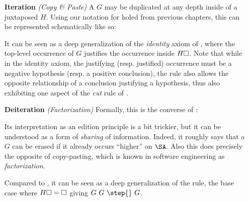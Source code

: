 \begin{itemize}
  \item[\textbf{Iteration} \textit{(Copy \& Paste)}]
    A  $G$ may be duplicated at any depth inside of a juxtaposed  $H$.
    Using our notation for holed  from previous chapters, this can be
    represented schematically like so:
    It can be seen as a deep generalization of the \emph{identity} axiom of
    , where the top-level occurrence of $G$ justifies the
    occurrence inside $H\square$. Note that while in the identity axiom, the justifying
    (resp. justified) occurrence must be a negative hypothesis (resp. a positive
    conclusion), the  rule also allows the opposite relationship
    of a conclusion justifying a hypothesis, thus also exhibiting one aspect of
    the \emph{cut} rule of .
  \item[\textbf{Deiteration} \textit{(Factorization)}]
    Formally, this is the converse of :
    Its interpretation as an edition principle is a bit trickier, but it can be
    understood as a form of \emph{sharing} of information. Indeed, it roughly
    says that a  $G$ can be erased if it already occurs ``higher'' on
    $\SA$. Also this does precisely the opposite of copy-pasting, which is known
    in software engineering as \emph{factorization}.
    
    Compared to , it can be seen as a deep generalization of the
    \emph{} rule, the base case where $H\square = \square$ giving $G~G
    ~\step{}~ G$.
\end{itemize}
